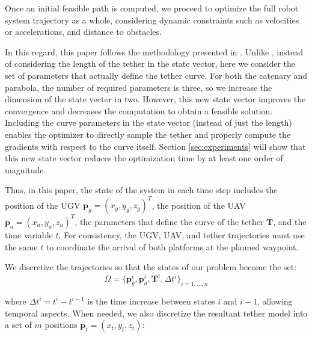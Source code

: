 Once an initial feasible path is computed, we proceed to optimize the full robot system trajectory as a whole, considering dynamic constraints such as velocities or accelerations, and distance to obstacles. 

In this regard, this paper follows the methodology presented in \cite{smartinezr2023}. Unlike \cite{smartinezr2023}, instead of considering the length of the tether in the state vector, here we consider the set of parameters that actually define the tether curve. For both the catenary and parabola, the number of required parameters is three, so we increase the dimension of the state vector in two.  %
However, this new state vector improves the convergence and decreases the computation to obtain a feasible solution. Including the curve parameters in the state vector (instead of just the length) enables the optimizer to directly sample the tether and properly compute the gradients with respect to the curve itself. Section \ref{sec:experiments} will show that this new state vector reduces the optimization time by at least one order of magnitude.


Thus, in this paper, the state of the system in each time step includes the position of the UGV $\mathbf{p}_g=(x_g,y_g,z_g)^{T}$, the position of the UAV $\mathbf{p}_a=(x_a,y_a,z_a)^{T}$, the parameters that define the curve of the tether $\mathbf{T}$, and the time variable $t$. For consistency, the UGV, UAV, and tether trajectories must use the same $t$ to coordinate the arrival of both platforms at the planned waypoint. 

We discretize the trajectories so that the states of our problem become the set:
\begin{equation}
\label{eq:traj_params}
\Omega = \{\mathbf{p}^i_g,\mathbf{p}^i_a,\mathbf{T}^i,\Delta t^i\}_{i=1,...,n}
\end{equation}

\noindent where $\Delta t^{i} = t^{i} - t^{i-1}$ is the time increase between states $i$ and $i-1$, allowing temporal aspects. When needed, we also discretize the resultant tether model into a set of $m$ positions $\mathbf{p}_{t}=(x_{t}, y_{t}, z_{t})$:

